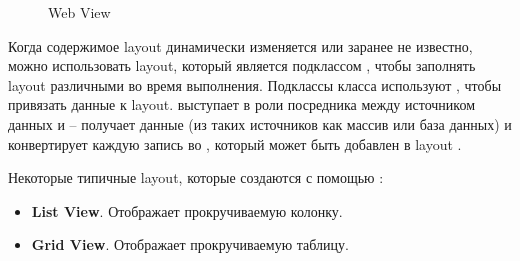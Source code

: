 \begin{figure}[H]
  \caption{Web View}
\endminipage
\end{figure}


Когда содержимое layout динамически изменяется или заранее не известно, можно
использовать layout, который является подклассом \AdapterView, чтобы заполнять
layout различными \View во время выполнения. Подклассы класса \AdapterView
используют \Adapter, чтобы привязать данные к layout. \Adapter выступает в роли
посредника между источником данных и \AdapterView -- \Adapter получает данные
(из таких источников как массив или база данных) и конвертирует каждую запись
во \View, который может быть добавлен в layout \AdapterView.

Некоторые типичные layout, которые создаются с помощью \Adapter:
\begin{itemize}
  \item \textbf{List View}. Отображает прокручиваемую колонку.
  
  \item \textbf{Grid View}. Отображает прокручиваемую таблицу.
\end{itemize}

